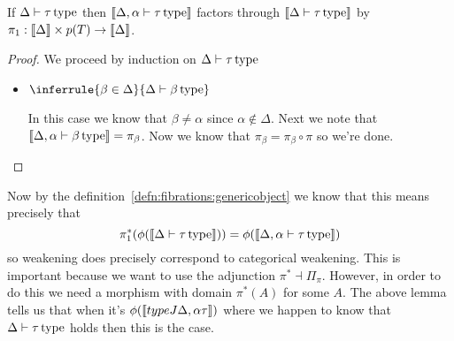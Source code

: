 \begin{lem}\label{lem:systemf:weakening}
  If $\Delta \vdash \tau\,\mathrm{type}$ then
  $\llbracket \Delta, \alpha \vdash \tau\,\mathrm{type} \rrbracket$ factors through
  $\llbracket \Delta \vdash \tau\,\mathrm{type} \rrbracket$ by
  $\pi_1 : \llbracket \Delta \rrbracket \times p(T) \to \llbracket \Delta \rrbracket$.
\end{lem}
\begin{proof}
  We proceed by induction on $\Delta \vdash \tau\,\mathrm{type}$
  \begin{itemize}
  \item
    $\inferrule{
      \beta \in \Delta
    }{\typeJ{\Delta}{\beta}}$

    In this case we know that $\beta \neq \alpha$ since
    $\alpha \not\in \Delta$. Next we note that
    $\llbracket \Delta, \alpha \vdash \beta\,\mathrm{type} \rrbracket = \pi_\beta$. Now we know
    that $\pi_\beta = \pi_\beta \circ \pi$ so we're done.
  \end{itemize}
\end{proof}

Now by the definition~\ref{defn:fibrations:genericobject} we know that
this means precisely that
\[
  \pi_1^*(\phi(\llbracket \Delta \vdash \tau\,\mathrm{type} \rrbracket)) = \phi(\llbracket \Delta, \alpha \vdash \tau\,\mathrm{type} \rrbracket)
\]
so weakening does precisely correspond to categorical weakening. This
is important because we want to use the adjunction
$\pi^* \dashv \Pi_\pi$. However, in order to do this we need a
morphism with domain $\pi^*(A)$ for some $A$. The above lemma tells us
that when it's $\phi(\llbracket typeJ{\Delta, \alpha}{\tau} \rrbracket)$ where we
happen to know that $\Delta \vdash \tau\,\mathrm{type}$ holds then this is the case.

